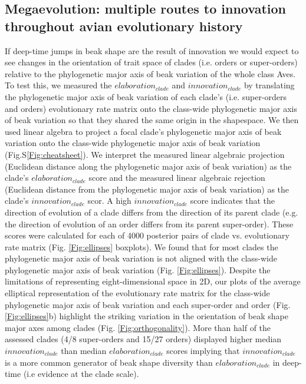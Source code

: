 \documentclass[12pt,letterpaper]{article}
\begin{document}
\subsection{Megaevolution: multiple routes to innovation throughout avian evolutionary history}
If deep-time jumps in beak shape \cite{cooney2017mega} are the result of innovation we would expect to see changes in the orientation of trait space of clades (i.e. orders or super-orders) relative to the phylogenetic major axis of beak variation of the whole class Aves.
To test this, we measured the $elaboration_{clade}$ and $innovation_{clade}$ by translating the phylogenetic major axis of beak variation of each clade's (i.e. super-orders and orders) evolutionary rate matrix onto the class-wide phylogenetic major axis of beak variation so that they shared the same origin in the shapespace.
We then used linear algebra to project %
a focal clade's phylogenetic major axis of beak variation onto the class-wide phylogenetic major axis of beak variation (Fig.S\ref{Fig:cheatsheet}).
We interpret the measured linear algebraic projection (Euclidean distance along the phylogenetic major axis of beak variation) as the clade's $elaboration_{clade}$ score and the measured linear algebraic rejection (Euclidean distance from the phylogenetic major axis of beak variation) as the clade's $innovation_{clade}$ scor. %
A high $innovation_{clade}$ score indicates that the direction of evolution of a clade differs from the direction of its parent clade (e.g. the direction of evolution of an order differs from its parent super-order).
These scores were calculated for each of 4000 posterior pairs of clade vs.
evolutionary rate matrix (Fig. \ref{Fig:ellipses} boxplots).
We found that for most clades the phylogenetic major axis of beak variation is not aligned with the class-wide phylogenetic major axis of beak variation (Fig. \ref{Fig:ellipses}).
Despite the limitations of representing eight-dimensional space in 2D, our plots of the average elliptical representation of the evolutionary rate matrix for the class-wide phylogenetic major axis of beak variation and each super-order and order (Fig. \ref{Fig:ellipses}b) highlight the striking variation in the orientation of beak shape major axes among clades (Fig. \ref{Fig:orthogonality}).
More than half of the assessed clades (4/8 super-orders and 15/27 orders) displayed higher median $innovation_{clade}$ than median $elaboration_{clade}$ scores implying that $innovation_{clade}$ is a more common generator of beak shape diversity than $elaboration_{clade}$ in deep-time (i.e evidence at the clade scale).
\end{document}
